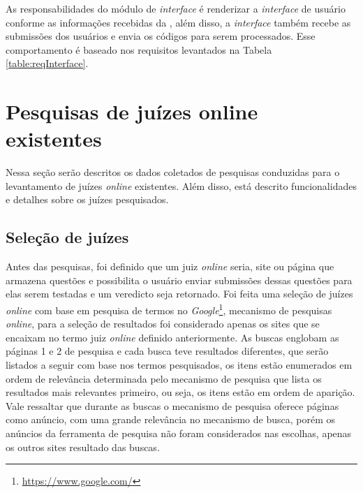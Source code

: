 As responsabilidades do módulo de \textit{interface} é renderizar a \textit{interface} de usuário conforme as informações recebidas da , além disso, a \textit{interface} também recebe as submissões dos usuários e envia os códigos para serem processados. Esse comportamento é baseado nos requisitos levantados na Tabela \ref{table:reqInterface}.



\section{Pesquisas de juízes online existentes}

Nessa seção serão descritos os dados coletados de pesquisas conduzidas para o levantamento de juízes \textit{online} existentes. Além disso, está descrito funcionalidades e detalhes sobre os juízes pesquisados.

\subsection{Seleção de juízes}
\label{subsec:selecao_juizes}

Antes das pesquisas, foi definido que um juiz \textit{online} seria, site ou página que armazena questões e possibilita o usuário enviar submissões dessas questões para elas serem testadas e um veredicto seja retornado. Foi feita uma seleção de juízes \textit{online} com base em pesquisa de termos no \textit{Google}\footnote{\url{https://www.google.com/}}, mecanismo de pesquisas \textit{online}, para a seleção de resultados foi considerado apenas os sites que se encaixam no termo juiz \textit{online} definido anteriormente. As buscas englobam as páginas 1 e 2 de pesquisa e cada busca teve resultados diferentes, que serão listados a seguir com base nos termos pesquisados, os itens estão enumerados em ordem de relevância determinada pelo mecanismo de pesquisa que lista os resultados mais relevantes primeiro, ou seja, os itens estão em ordem de aparição. Vale ressaltar que durante as buscas o mecanismo de pesquisa oferece páginas como anúncio, com uma grande relevância no mecanismo de busca, porém os anúncios da ferramenta de pesquisa não foram considerados nas escolhas, apenas os outros sites resultado das buscas.

